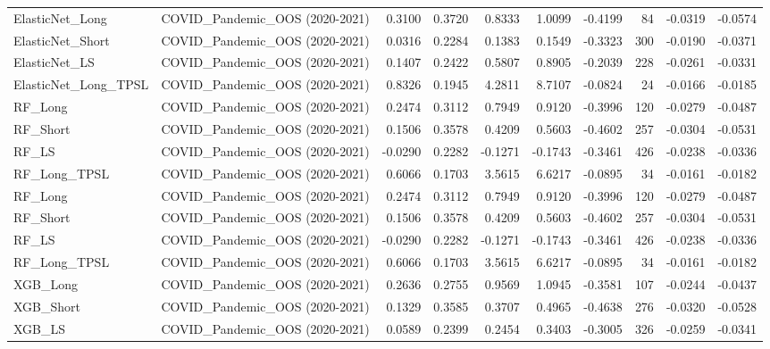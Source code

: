 \begin{tabular}{llrrrrrrrr}
\cline{1-10}
ElasticNet\_Long & COVID\_Pandemic\_OOS (2020-2021) & 0.3100 & 0.3720 & 0.8333 & 1.0099 & -0.4199 & 84 & -0.0319 & -0.0574 \\
\cline{1-10}
ElasticNet\_Short & COVID\_Pandemic\_OOS (2020-2021) & 0.0316 & 0.2284 & 0.1383 & 0.1549 & -0.3323 & 300 & -0.0190 & -0.0371 \\
\cline{1-10}
ElasticNet\_LS & COVID\_Pandemic\_OOS (2020-2021) & 0.1407 & 0.2422 & 0.5807 & 0.8905 & -0.2039 & 228 & -0.0261 & -0.0331 \\
\cline{1-10}
ElasticNet\_Long\_TPSL & COVID\_Pandemic\_OOS (2020-2021) & 0.8326 & 0.1945 & 4.2811 & 8.7107 & -0.0824 & 24 & -0.0166 & -0.0185 \\
\cline{1-10}
RF\_Long & COVID\_Pandemic\_OOS (2020-2021) & 0.2474 & 0.3112 & 0.7949 & 0.9120 & -0.3996 & 120 & -0.0279 & -0.0487 \\
\cline{1-10}
RF\_Short & COVID\_Pandemic\_OOS (2020-2021) & 0.1506 & 0.3578 & 0.4209 & 0.5603 & -0.4602 & 257 & -0.0304 & -0.0531 \\
\cline{1-10}
RF\_LS & COVID\_Pandemic\_OOS (2020-2021) & -0.0290 & 0.2282 & -0.1271 & -0.1743 & -0.3461 & 426 & -0.0238 & -0.0336 \\
\cline{1-10}
RF\_Long\_TPSL & COVID\_Pandemic\_OOS (2020-2021) & 0.6066 & 0.1703 & 3.5615 & 6.6217 & -0.0895 & 34 & -0.0161 & -0.0182 \\
\cline{1-10}
RF\_Long & COVID\_Pandemic\_OOS (2020-2021) & 0.2474 & 0.3112 & 0.7949 & 0.9120 & -0.3996 & 120 & -0.0279 & -0.0487 \\
\cline{1-10}
RF\_Short & COVID\_Pandemic\_OOS (2020-2021) & 0.1506 & 0.3578 & 0.4209 & 0.5603 & -0.4602 & 257 & -0.0304 & -0.0531 \\
\cline{1-10}
RF\_LS & COVID\_Pandemic\_OOS (2020-2021) & -0.0290 & 0.2282 & -0.1271 & -0.1743 & -0.3461 & 426 & -0.0238 & -0.0336 \\
\cline{1-10}
RF\_Long\_TPSL & COVID\_Pandemic\_OOS (2020-2021) & 0.6066 & 0.1703 & 3.5615 & 6.6217 & -0.0895 & 34 & -0.0161 & -0.0182 \\
\cline{1-10}
XGB\_Long & COVID\_Pandemic\_OOS (2020-2021) & 0.2636 & 0.2755 & 0.9569 & 1.0945 & -0.3581 & 107 & -0.0244 & -0.0437 \\
\cline{1-10}
XGB\_Short & COVID\_Pandemic\_OOS (2020-2021) & 0.1329 & 0.3585 & 0.3707 & 0.4965 & -0.4638 & 276 & -0.0320 & -0.0528 \\
\cline{1-10}
XGB\_LS & COVID\_Pandemic\_OOS (2020-2021) & 0.0589 & 0.2399 & 0.2454 & 0.3403 & -0.3005 & 326 & -0.0259 & -0.0341 \\

\end{tabular}

